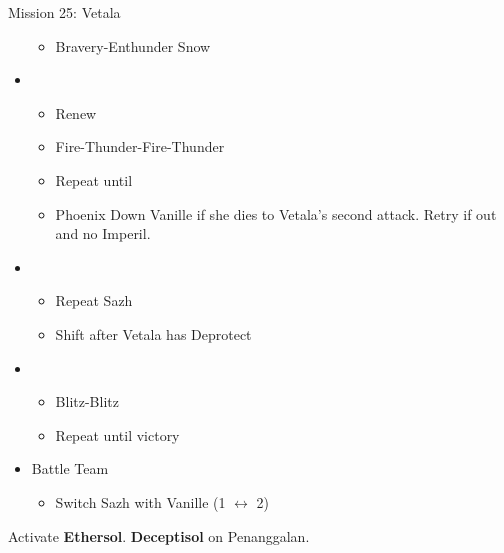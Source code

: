 \begin{multicols}{2}
\begin{battle}{Mission 25: Vetala}
\begin{itemize}
\begin{itemize}
        \item Bravery-Enthunder Snow
    \end{itemize}
    \item \fifth
    \begin{itemize}
        \item Renew
        \item Fire-Thunder-Fire-Thunder
        \item Repeat until \stagger
        \item Phoenix Down Vanille if she dies to Vetala's second attack. Retry if out and no Imperil.
    \end{itemize}
    \columnbreak
    \item \first
    \begin{itemize}
        \item Repeat Sazh
        \item Shift after Vetala has Deprotect
    \end{itemize}
    \item \second
    \begin{itemize}
        \item Blitz-Blitz
        \item Repeat until victory
    \end{itemize}
\end{itemize}
\end{battle}
\columnbreak
\begin{menu}
\begin{itemize}
    \paradigm
    \begin{itemize}
        \item {}%
{\paradigmline{\syn}{(\rav)}{(\sen)}}%
{\paradigmline[2]{\textit{\com}}{\textit{(\rav)}}{\textit{(\rav)}}}%
{\paradigmline{(\rav)}{(\rav)}{(\sen)}}%
{\paradigmline{\com}{(\rav)}{\com}}%
{\paradigmline{\rav}{\sab}{(\sen)}}%
{\paradigmline{\com}{\rav}{\com}}
    \end{itemize}
    \item Battle Team
    \begin{itemize}
        \item Switch Sazh with Vanille (1 $\leftrightarrow$ 2)
    \end{itemize}
\end{itemize}
\end{menu}
 Activate \textbf{Ethersol}. \textbf{Deceptisol} on Penanggalan.
\renewcommand{\second}{[2] Relentless Assault (\rav/\rav/\com)}
\renewcommand{\third}{[3] Mystic Tower (\rav/\rav/\sen)}


\end{multicols}
